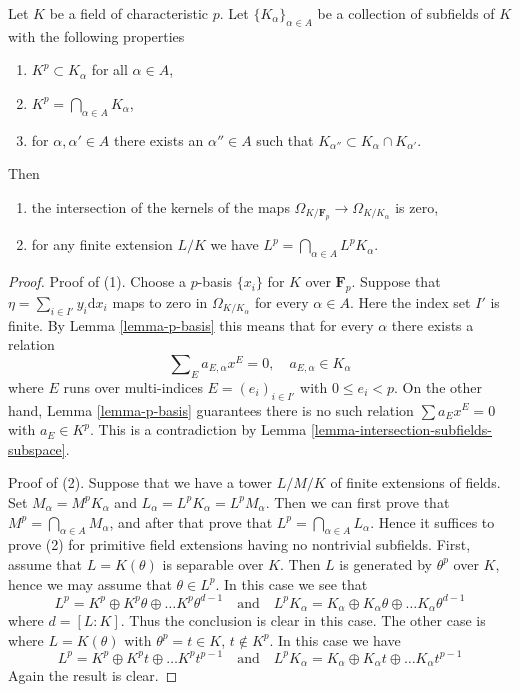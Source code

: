 \begin{lemma}
\label{lemma-intersection-subfields}
Let $K$ be a field of characteristic $p$. Let $\{K_\alpha\}_{\alpha \in A}$
be a collection of subfields of $K$ with the following properties
\begin{enumerate}
\item $K^p \subset K_\alpha$ for all $\alpha \in A$,
\item $K^p = \bigcap_{\alpha \in A} K_\alpha$,
\item for $\alpha, \alpha' \in A$ there exists an $\alpha'' \in A$
such that $K_{\alpha''} \subset K_\alpha \cap K_{\alpha'}$.
\end{enumerate}
Then
\begin{enumerate}
\item the intersection of the kernels of the maps
$\Omega_{K/\mathbf{F}_p} \to \Omega_{K/K_\alpha}$ is zero,
\item for any finite extension $L/K$ we have
$L^p = \bigcap_{\alpha \in A} L^pK_\alpha$.
\end{enumerate}
\end{lemma}

\begin{proof}
Proof of (1).
Choose a $p$-basis $\{x_i\}$ for $K$ over $\mathbf{F}_p$.
Suppose that $\eta = \sum_{i \in I'} y_i \text{d}x_i$ maps to zero in
$\Omega_{K/K_\alpha}$ for every $\alpha \in A$. Here the index set
$I'$ is finite. By Lemma \ref{lemma-p-basis}
this means that for every $\alpha$ there exists a relation
$$
\sum\nolimits_E a_{E, \alpha} x^E = 0,\quad a_{E, \alpha} \in K_\alpha
$$
where $E$ runs over multi-indices $E = (e_i)_{i \in I'}$ with
$0 \leq e_i < p$. On the other hand, Lemma \ref{lemma-p-basis}
guarantees there is no such relation $\sum a_E x^E = 0$ with
$a_E \in K^p$. This is a contradiction by
Lemma \ref{lemma-intersection-subfields-subspace}.

\medskip\noindent
Proof of (2). Suppose that we have a tower $L/M/K$
of finite extensions of fields. Set $M_\alpha = M^p K_\alpha$
and $L_\alpha = L^p K_\alpha = L^p M_\alpha$. Then we can first prove that
$M^p = \bigcap_{\alpha \in A} M_\alpha$, and after that prove
that $L^p = \bigcap_{\alpha \in A} L_\alpha$. Hence it suffices to
prove (2) for primitive field extensions having no nontrivial subfields.
First, assume that $L = K(\theta)$ is separable over $K$. Then
$L$ is generated by $\theta^p$ over $K$, hence we may assume that
$\theta \in L^p$. In this case we see that
$$
L^p = K^p \oplus K^p\theta \oplus \ldots K^p\theta^{d - 1}
\quad\text{and}\quad
L^pK_\alpha =
K_\alpha \oplus K_\alpha \theta \oplus \ldots K_\alpha\theta^{d - 1}
$$
where $d = [L : K]$. Thus the conclusion is clear in this case. The other
case is where $L = K(\theta)$ with $\theta^p = t \in K$, $t \not \in K^p$.
In this case we have
$$
L^p = K^p \oplus K^pt \oplus \ldots K^pt^{p - 1}
\quad\text{and}\quad
L^pK_\alpha =
K_\alpha \oplus K_\alpha t \oplus \ldots K_\alpha t^{p - 1}
$$
Again the result is clear.
\end{proof}
